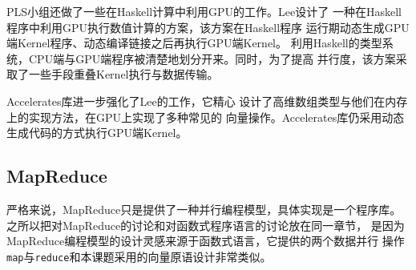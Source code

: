PLS小组还做了一些在Haskell计算中利用GPU的工作。Lee设计了
一种在Haskell程序中利用GPU执行数值计算的方案，该方案在Haskell程序
运行期动态生成GPU端Kernel程序、动态编译链接之后再执行GPU端Kernel。
利用Haskell的类型系统，CPU端与GPU端程序被清楚地划分开来。同时，为了提高
并行度，该方案采取了一些手段重叠Kernel执行与数据传输。

Accelerates库进一步强化了Lee的工作，它精心
设计了高维数组类型与他们在内存上的实现方法，在GPU上实现了多种常见的
向量操作。Accelerates库仍采用动态生成代码的方式执行GPU端Kernel。


\subsection{MapReduce}
严格来说，MapReduce只是提供了一种并行编程模型，具体实现是一个程序库。
之所以把对MapReduce的讨论和对函数式程序语言的讨论放在同一章节，
是因为MapReduce编程模型的设计灵感来源于函数式语言，它提供的两个数据并行
操作\texttt{map}与\texttt{reduce}和本课题采用的向量原语设计非常类似。

